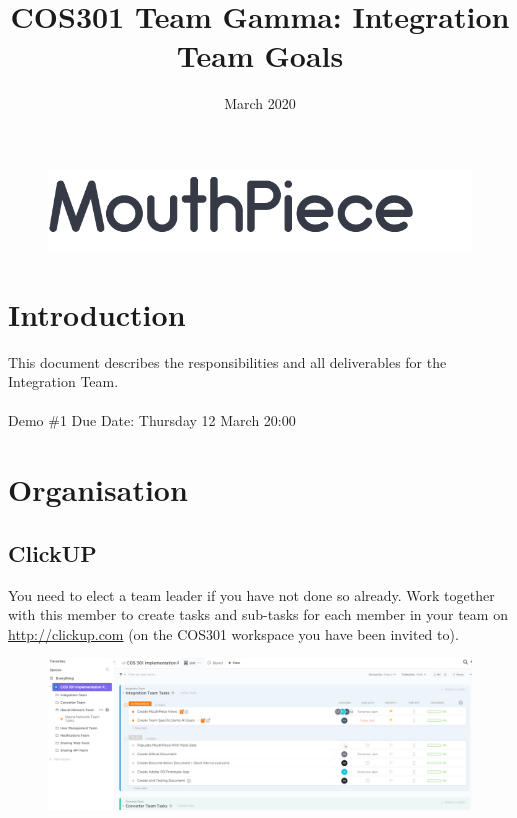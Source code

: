 \documentclass{article}
\begin{document}
\title{COS301 Team Gamma: Integration Team Goals}
\begin{figure}
    \centering
    \includegraphics[width=\textwidth]{logo.png}
\end{figure}
\date{March 2020}

\maketitle

\section{Introduction}
This document describes the responsibilities and all deliverables for the \\Integration Team.
\\ \\
Demo \#1 Due Date: Thursday 12 March 20:00
\newpage

\section{Organisation}
\subsection{ClickUP}
You need to elect a team leader if you have not done so already. Work together with this member to create tasks and sub-tasks for each member in your team on \url{http://clickup.com} (on the COS301 workspace you have been invited to). \\

\begin{figure}[h]
    \centering
    \includegraphics[width=\textwidth]{clickup.png}
\end{figure}
\end{document}
